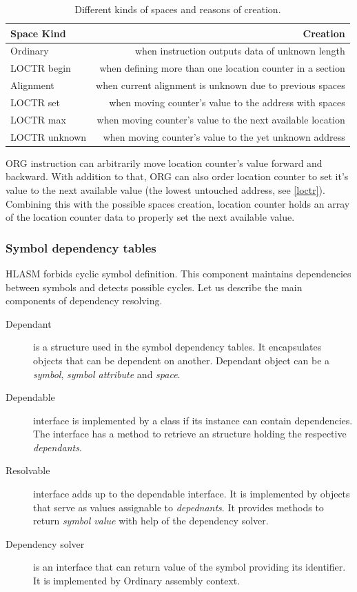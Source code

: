 \begin{table}
	\centering
	\begin{tabular}{lr}
		\textbf{Space Kind} &                                          \textbf{Creation} \\ \toprule
		Ordinary            &            when instruction outputs data of unknown length \\
		LOCTR begin         &  when defining more than one location counter in a section \\
		Alignment           &   when current alignment is unknown due to previous spaces \\
		LOCTR set           &     when moving counter's value to the address with spaces \\
		LOCTR max           & when moving counter's value to the next available location \\
		LOCTR unknown       &     when moving counter's value to the yet unknown address \\ \bottomrule
	\end{tabular}
	\caption{Different kinds of spaces and reasons of creation.}
	\label{tab06:space}
\end{table}

ORG instruction can arbitrarily move location counter's value forward and backward. With addition to that, ORG can also order location counter to set it's value to the next available value (the lowest untouched address, see \cref{loctr}). Combining this with the possible spaces creation, location counter holds an array of the location counter data to properly set the next available value.

\subsubsection{Symbol dependency tables}
\label{symbol_dependency_tables}
HLASM forbids cyclic symbol definition. This component maintains dependencies between symbols and detects possible cycles.
Let us describe the main components of dependency resolving.

\begin{description}
	\item[Dependant] is a structure used in the symbol dependency tables. It encapsulates objects that can be dependent on another. Dependant object can be a \emph{symbol}, \emph{symbol attribute} and \emph{space}.
	\item[Dependable] interface is implemented by a class if its instance can contain dependencies. The interface has a method to retrieve an structure holding the respective \emph{dependants}. 
	\item[Resolvable] interface adds up to the dependable interface. It is implemented by objects that serve as values assignable to \emph{depednants}. It provides methods to return \emph{symbol value} with help of the dependency solver. 
	\item[Dependency solver] is an interface that can return value of the symbol providing its identifier. It is implemented by Ordinary assembly context.
\end{description}

